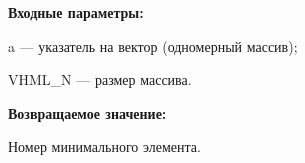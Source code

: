 \textbf{Входные параметры:}

 a --- указатель на вектор (одномерный массив);
 
 VHML\_N --- размер массива.

\textbf{Возвращаемое значение:}

Номер минимального элемента.